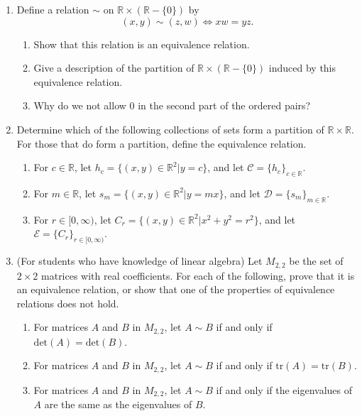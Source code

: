 \documentclass[
]{book}
\providecommand{\tightlist}{%
  \setlength{\itemsep}{0pt}\setlength{\parskip}{0pt}}
\theoremstyle{definition}
\theoremstyle{definition}
\theoremstyle{definition}
\theoremstyle{remark}
\begin{document}
\begin{enumerate}
\def\labelenumi{\arabic{enumi}.}
\item
  Define a relation \(\sim\) on \(\mathbb{R}\times (\mathbb{R}-\{0\})\) by
  \[(x,y) \sim (z,w) \Leftrightarrow xw=yz.\]

  \begin{enumerate}
  \def\labelenumii{\alph{enumii}.}
  \tightlist
  \item
    Show that this relation is an equivalence relation.
  \item
    Give a description of the partition of \(\mathbb{R}\times (\mathbb{R}-\{0\})\) induced by this equivalence relation.
  \item
    Why do we not allow \(0\) in the second part of the ordered pairs?
  \end{enumerate}
\item
  Determine which of the following collections of sets form a partition of \(\mathbb{R}\times \mathbb{R}\). For those that do form a partition, define the equivalence relation.

  \begin{enumerate}
  \def\labelenumii{\alph{enumii}.}
  \tightlist
  \item
    For \(c\in \mathbb{R}\), let \(h_c= \{ (x,y)\in \mathbb{R}^2 \vert y=c\}\), and let \(\mathcal{C} = \{h_c\}_{c\in \mathbb{R}}\).
  \item
    For \(m\in \mathbb{R}\), let \(s_m=\{ (x,y)\in \mathbb{R}^2 \vert y=mx\}\), and let \(\mathcal{D}= \{s_m\}_{m\in \mathbb{R}}\).
  \item
    For \(r\in [0,\infty)\), let \(C_r=\{ (x,y) \in \mathbb{R}^2 \vert x^2+y^2=r^2\}\), and let \(\mathcal{E}=\{C_r\}_{r\in [0,\infty)}\).
  \end{enumerate}
\item
  (For students who have knowledge of linear algebra) Let \(M_{2,2}\) be the set of \(2 \times 2\) matrices with real coefficients. For each of the following, prove that it is an equivalence relation, or show that one of the properties of equivalence relations does not hold.

  \begin{enumerate}
  \def\labelenumii{\alph{enumii}.}
  \tightlist
  \item
    For matrices \(A\) and \(B\) in \(M_{2,2}\), let \(A \sim B\) if and only if \(\mathrm{det}(A)=\mathrm{det}(B)\).
  \item
    For matrices \(A\) and \(B\) in \(M_{2,2}\), let \(A \sim B\) if and only if \(\mathrm{tr}(A)=\mathrm{tr}(B)\).
  \item
    For matrices \(A\) and \(B\) in \(M_{2,2}\), let \(A \sim B\) if and only if the eigenvalues of \(A\) are the same as the eigenvalues of \(B\).
  \end{enumerate}
\end{enumerate}
\end{document}
